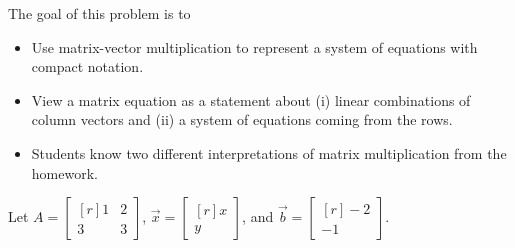\documentclass{problemset}
\newcommand{\mat}[1]{\begin{bmatrix*}[r]#1\end{bmatrix*}}
\begin{document}
	\question
	\begin{annotation}
		\begin{goals}

			The goal of this problem is to
			\begin{itemize}
				\item Use matrix-vector multiplication to represent a system of equations
					with compact notation.
				\item View a matrix equation as a statement about (i) linear combinations of column vectors
					and (ii) a system of equations coming from the rows.
			\end{itemize}
		\end{goals}

		\begin{notes}
			\begin{itemize}
				\item Students know two different interpretations of matrix multiplication from
					the homework.
			\end{itemize}
		\end{notes}
	\end{annotation}
	Let $A=\mat{1&2\\3&3}$, $\vec x=\mat{x\\y}$, and $\vec b=\mat{-2\\-1}$.
\end{document}
